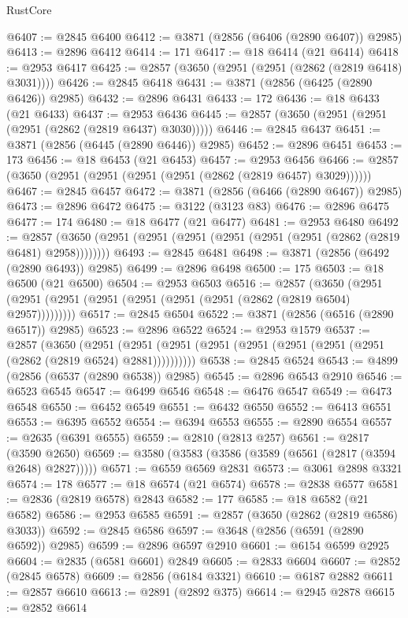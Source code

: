 \begin{lexlean}{RustCore}
\begin{coremodule}
@6407 := @2845 @6400
@6412 := @3871 (@2856 (@6406 (@2890 @6407)) @2985)
@6413 := @2896 @6412
@6414 := 171
@6417 := @18 @6414 (@21 @6414)
@6418 := @2953 @6417
@6425 := @2857 (@3650 (@2951 (@2951 (@2862 (@2819 @6418) @3031))))
@6426 := @2845 @6418
@6431 := @3871 (@2856 (@6425 (@2890 @6426)) @2985)
@6432 := @2896 @6431
@6433 := 172
@6436 := @18 @6433 (@21 @6433)
@6437 := @2953 @6436
@6445 := @2857 (@3650 (@2951 (@2951 (@2951 (@2862 (@2819 @6437) @3030)))))
@6446 := @2845 @6437
@6451 := @3871 (@2856 (@6445 (@2890 @6446)) @2985)
@6452 := @2896 @6451
@6453 := 173
@6456 := @18 @6453 (@21 @6453)
@6457 := @2953 @6456
@6466 := @2857 (@3650 (@2951 (@2951 (@2951 (@2951 (@2862 (@2819 @6457) @3029))))))
@6467 := @2845 @6457
@6472 := @3871 (@2856 (@6466 (@2890 @6467)) @2985)
@6473 := @2896 @6472
@6475 := @3122 (@3123 @83)
@6476 := @2896 @6475
@6477 := 174
@6480 := @18 @6477 (@21 @6477)
@6481 := @2953 @6480
@6492 := @2857 (@3650 (@2951 (@2951 (@2951 (@2951 (@2951 (@2951 (@2862 (@2819 @6481) @2958))))))))
@6493 := @2845 @6481
@6498 := @3871 (@2856 (@6492 (@2890 @6493)) @2985)
@6499 := @2896 @6498
@6500 := 175
@6503 := @18 @6500 (@21 @6500)
@6504 := @2953 @6503
@6516 := @2857
    (@3650 (@2951 (@2951 (@2951 (@2951 (@2951 (@2951 (@2951 (@2862 (@2819 @6504) @2957)))))))))
@6517 := @2845 @6504
@6522 := @3871 (@2856 (@6516 (@2890 @6517)) @2985)
@6523 := @2896 @6522
@6524 := @2953 @1579
@6537 := @2857
    (@3650
      (@2951 (@2951 (@2951 (@2951 (@2951 (@2951 (@2951 (@2951 (@2862 (@2819 @6524) @2881))))))))))
@6538 := @2845 @6524
@6543 := @4899 (@2856 (@6537 (@2890 @6538)) @2985)
@6545 := @2896 @6543 @2910
@6546 := @6523 @6545
@6547 := @6499 @6546
@6548 := @6476 @6547
@6549 := @6473 @6548
@6550 := @6452 @6549
@6551 := @6432 @6550
@6552 := @6413 @6551
@6553 := @6395 @6552
@6554 := @6394 @6553
@6555 := @2890 @6554
@6557 := @2635 (@6391 @6555)
@6559 := @2810 (@2813 @257)
@6561 := @2817 (@3590 @2650)
@6569 := @3580 (@3583 (@3586 (@3589 (@6561 (@2817 (@3594 @2648) @2827)))))
@6571 := @6559 @6569 @2831
@6573 := @3061 @2898 @3321
@6574 := 178
@6577 := @18 @6574 (@21 @6574)
@6578 := @2838 @6577
@6581 := @2836 (@2819 @6578) @2843
@6582 := 177
@6585 := @18 @6582 (@21 @6582)
@6586 := @2953 @6585
@6591 := @2857 (@3650 (@2862 (@2819 @6586) @3033))
@6592 := @2845 @6586
@6597 := @3648 (@2856 (@6591 (@2890 @6592)) @2985)
@6599 := @2896 @6597 @2910
@6601 := @6154 @6599 @2925
@6604 := @2835 (@6581 @6601) @2849
@6605 := @2833 @6604
@6607 := @2852 (@2845 @6578)
@6609 := @2856 (@6184 @3321)
@6610 := @6187 @2882
@6611 := @2857 @6610
@6613 := @2891 (@2892 @375)
@6614 := @2945 @2878
@6615 := @2852 @6614

\end{coremodule}
\end{lexlean}
